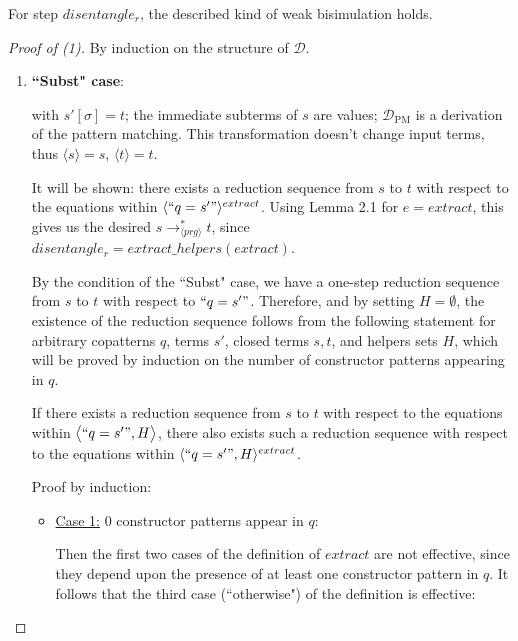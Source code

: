 \documentclass[11pt]{article} %
\begin{document}
For step $disentangle_r$, the described kind of weak bisimulation holds.

\begin{proof}[Proof of (1)] By induction on the structure of $\mathcal{D}$.

\begin{enumerate}
\item \textbf{``Subst" case}:

\begin{prooftree}
\end{prooftree}

with $s'[\sigma] = t$; the immediate subterms of $s$ are values; $\mathcal{D}_{\textrm{PM}}$ is a derivation of the pattern matching. This transformation doesn't change input terms, thus $\langle s \rangle = s$, $\langle t \rangle = t$.

It will be shown: there exists a reduction sequence from $s$ to $t$ with respect to the equations within $\langle `` q = s' " \rangle^{extract}$. Using Lemma 2.1 for $e = extract$, this gives us the desired $s \longrightarrow_{\langle prg \rangle}^* t$, since $disentangle_r = extract\_helpers(extract)$.

By the condition of the ``Subst" case, we have a one-step reduction sequence from $s$ to $t$ with respect to $`` q = s' "$. Therefore, and by setting $H = \emptyset$, the existence of the reduction sequence follows from the following statement for arbitrary copatterns $q$, terms $s'$, closed terms $s,t$, and helpers sets $H$, which will be proved by induction on the number of constructor patterns appearing in $q$.

If there exists a reduction sequence from $s$ to $t$ with respect to the equations within $\big\langle `` q = s' ", H \big\rangle$, there also exists such a reduction sequence with respect to the equations within $\langle `` q = s' ", H \rangle^{extract}$.

Proof by induction:

\begin{itemize}

\item \underline{Case 1:} 0 constructor patterns appear in $q$:

Then the first two cases of the definition of $extract$ are not effective, since they depend upon the presence of at least one constructor pattern in $q$. It follows that the third case (``otherwise") of the definition is effective:


\end{itemize}
\end{enumerate}
\end{proof}
\end{document}
